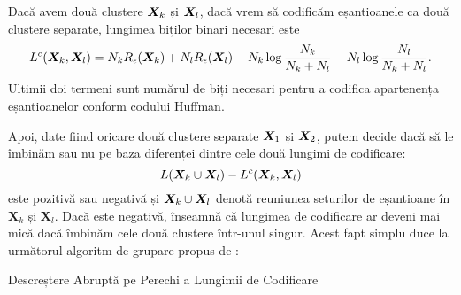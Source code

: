 \documentclass[../../book-main_ro.tex]{subfiles}
\begin{document}
Dacă avem două clustere $\bm{X}_k$ și $\bm{X}_l$, dacă vrem să codificăm eșantioanele ca două clustere separate, lungimea biților binari necesari este
\begin{equation*}
	L^c(\bm{X}_k, \bm{X}_l) = N_k R_\epsilon(\bm{X}_k) + N_l R_\epsilon(\bm{X}_l) - N_k \log\frac{N_k}{N_k + N_l} - N_l \log\frac{N_l}{N_k + N_l}.
\end{equation*}
Ultimii doi termeni sunt numărul de biți necesari pentru a codifica apartenența eșantioanelor conform codului Huffman.

Apoi, date fiind oricare două clustere separate $\bm{X}_1$ și $\bm{X}_2$, putem decide dacă să le îmbinăm sau nu pe baza diferenței dintre cele două lungimi de codificare:
\begin{equation}
	L(\bm{X}_k \cup \bm{X}_l) - L^c(\bm{X}_k, \bm{X}_l)
\end{equation}
este pozitivă sau negativă și $\bm{X}_k \cup \bm{X}_l$ denotă reuniunea seturilor de eșantioane în $\bm X_k$ și $\bm X_l$. Dacă este negativă, înseamnă că lungimea de codificare ar deveni mai mică dacă îmbinăm cele două clustere într-unul singur. Acest fapt simplu duce la următorul algoritm de grupare propus de \cite{ma2007segmentation}:
\begin{algorithm}[!htbp]
	\caption{Descreștere Abruptă pe Perechi a Lungimii de Codificare}\label{alg:steepest_descent_coding_length}
	\begin{algorithmic}[1]

		 
		 
		\State{\Return{\(\cC\)}} 
		\Else
		 
		 
		\EndIf
		\EndWhile
		\State{\Return{\(\cC\)}}  
		\EndProcedure
	\end{algorithmic}
\end{algorithm}
\end{document}
